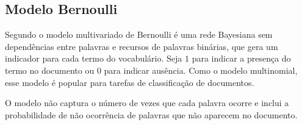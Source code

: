 \subsection{Modelo Bernoulli}

Segundo \cite{nigam1998} o modelo multivariado de Bernoulli é uma rede Bayesiana sem dependências entre palavras e recursos de palavras binárias,
que gera um indicador para cada termo do vocabulário. Seja $1$ para indicar a presença do termo no documento ou $ 0 $ para indicar ausência.
Como o modelo multinomial, esse modelo é popular para tarefas de classificação de documentos.

O modelo não captura o número de vezes que cada palavra ocorre e inclui a probabilidade de não ocorrência de palavras que não aparecem no documento.
















